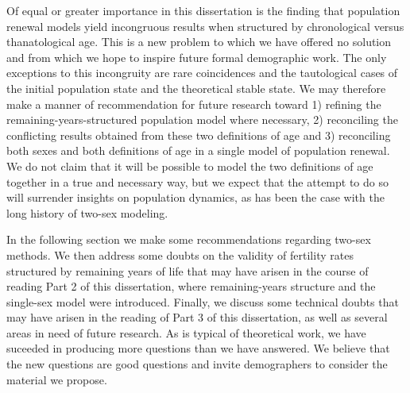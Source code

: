 Of equal or greater importance in this dissertation is the finding that
population renewal models yield incongruous results when structured by
chronological versus thanatological age. This is a new problem to 
which we have offered no solution and from which we hope to inspire future
formal demographic work. The only exceptions to this incongruity are rare
coincidences and the tautological cases of the initial population state and 
the theoretical stable state. We may therefore make a manner of recommendation for
future research toward 1) refining the remaining-years-structured population
model where necessary, 2) reconciling the conflicting results obtained from
these two definitions of age and 3) reconciling both sexes and both
definitions of age in a single model of population renewal. We do not claim that
it will be possible to model the two definitions of age together in a true and
necessary way, but we expect that the attempt to do so will surrender insights
on population dynamics, as has been the case with the long history of two-sex
modeling.

In the following section we make some recommendations regarding two-sex methods.
We then address some doubts on the validity of fertility rates structured by
remaining years of life that may have arisen in the course of reading Part 2 of
this dissertation, where remaining-years structure and the
single-sex model were introduced. Finally, we discuss some technical doubts that
may have arisen in the reading of Part 3 of this dissertation, as well as
several areas in need of future research. As is typical of theoretical work, we
have suceeded in producing more questions than we have answered. We believe that
the new questions are good questions and invite demographers to consider the
material we propose.

